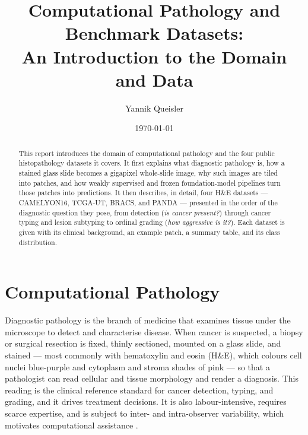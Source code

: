 \documentclass[11pt]{article}
\title{Computational Pathology and Benchmark Datasets:\\
An Introduction to the Domain and Data}
\author{Yannik Queisler}
\date{\today}
\begin{document}
\maketitle

\begin{abstract}
\noindent This report introduces the domain of computational pathology and the four public
histopathology datasets it covers. It first explains what diagnostic pathology is, how a stained glass slide becomes a
gigapixel whole-slide image, why such images are tiled into patches, and how weakly supervised and
frozen foundation-model pipelines turn those patches into predictions. It then describes, in detail,
four H\&E datasets --- CAMELYON16, TCGA-UT, BRACS, and PANDA --- presented in the order of the
diagnostic question they pose, from detection (\emph{is cancer present?}) through cancer typing and
lesion subtyping to ordinal grading (\emph{how aggressive is it?}). Each dataset is given with its
clinical background, an example patch, a summary table, and its class distribution.
\end{abstract}

\setcounter{tocdepth}{2}
\tableofcontents
\clearpage

\section{Computational Pathology}
\label{sec:cpath}
Diagnostic pathology is the branch of medicine that examines tissue under the microscope to detect
and characterise disease. When cancer is suspected, a biopsy or surgical resection is fixed, thinly
sectioned, mounted on a glass slide, and stained --- most commonly with hematoxylin and eosin
(H\&E), which colours cell nuclei blue-purple and cytoplasm and stroma shades of pink --- so that a
pathologist can read cellular and tissue morphology and render a diagnosis. This reading is the
clinical reference standard for cancer detection, typing, and grading, and it drives treatment
decisions. It is also labour-intensive, requires scarce expertise, and is subject to inter- and
intra-observer variability, which motivates computational assistance
\citep{madabhushi2016imageAnalysis,song2023aiPathology}.
\end{document}
